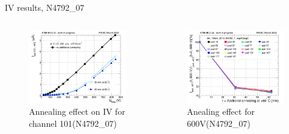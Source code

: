 \documentclass{beamer}
\begin{document}
\begin{frame}{IV results, N4792\_07}
  \begin{columns}
       \begin{figure}
           \includegraphics[width=1.0\textwidth]{plots/annealing_IV_ch101_N4792_7.png}
           \caption{Annealing effect on IV for channel 101(N4792\_07)}
       \end{figure}
       \begin{figure}
           \includegraphics[width=1.0\textwidth]{plots/annealing_current_N4792_7.png}
           \caption{Anealing effect for 600V(N4792\_07)}
       \end{figure}
   \end{columns}
\end{frame}
\end{document}
